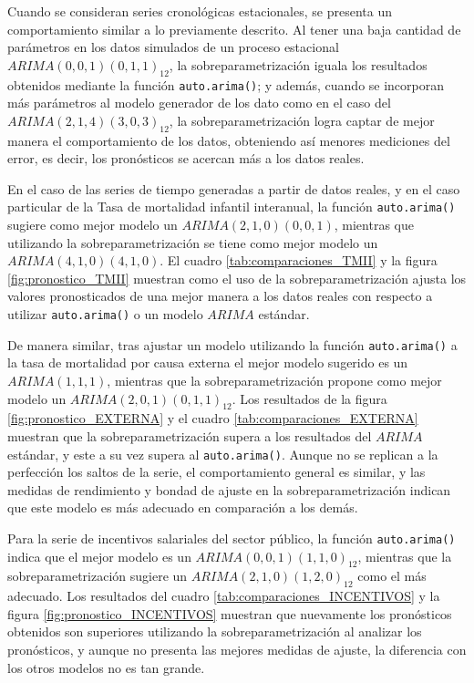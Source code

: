 \documentclass[
]{article}
\begin{document}
Cuando se consideran series cronológicas estacionales, se presenta un
comportamiento similar a lo previamente descrito. Al tener una baja
cantidad de parámetros en los datos simulados de un proceso estacional
\(ARIMA(0,0,1)(0,1,1)_{12}\), la sobreparametrización iguala los
resultados obtenidos mediante la función \texttt{auto.arima()}; y
además, cuando se incorporan más parámetros al modelo generador de los
dato como en el caso del \(ARIMA(2,1,4)(3,0,3)_{12}\), la
sobreparametrización logra captar de mejor manera el comportamiento de
los datos, obteniendo así menores mediciones del error, es decir, los
pronósticos se acercan más a los datos reales.

En el caso de las series de tiempo generadas a partir de datos reales, y
en el caso particular de la Tasa de mortalidad infantil interanual, la
función \texttt{auto.arima()} sugiere como mejor modelo un
\(ARIMA(2,1,0)(0,0,1)\), mientras que utilizando la sobreparametrización
se tiene como mejor modelo un \(ARIMA(4,1,0)(4,1,0)\). El cuadro
\ref{tab:comparaciones_TMII} y la figura \ref{fig:pronostico_TMII}
muestran como el uso de la sobreparametrización ajusta los valores
pronosticados de una mejor manera a los datos reales con respecto a
utilizar \texttt{auto.arima()} o un modelo \(ARIMA\) estándar.

De manera similar, tras ajustar un modelo utilizando la función
\texttt{auto.arima()} a la tasa de mortalidad por causa externa el mejor
modelo sugerido es un \(ARIMA(1,1,1)\), mientras que la
sobreparametrización propone como mejor modelo un
\(ARIMA(2,0,1)(0,1,1)_{12}\). Los resultados de la figura
\ref{fig:pronostico_EXTERNA} y el cuadro \ref{tab:comparaciones_EXTERNA}
muestran que la sobreparametrización supera a los resultados del
\(ARIMA\) estándar, y este a su vez supera al \texttt{auto.arima()}.
Aunque no se replican a la perfección los saltos de la serie, el
comportamiento general es similar, y las medidas de rendimiento y bondad
de ajuste en la sobreparametrización indican que este modelo es más
adecuado en comparación a los demás.

Para la serie de incentivos salariales del sector público, la función
\texttt{auto.arima()} indica que el mejor modelo es un
\(ARIMA(0,0,1)(1,1,0)_{12}\), mientras que la sobreparametrización
sugiere un \(ARIMA(2,1,0)(1,2,0)_{12}\) como el más adecuado. Los
resultados del cuadro \ref{tab:comparaciones_INCENTIVOS} y la figura
\ref{fig:pronostico_INCENTIVOS} muestran que nuevamente los pronósticos
obtenidos son superiores utilizando la sobreparametrización al analizar
los pronósticos, y aunque no presenta las mejores medidas de ajuste, la
diferencia con los otros modelos no es tan grande.
\end{document}
